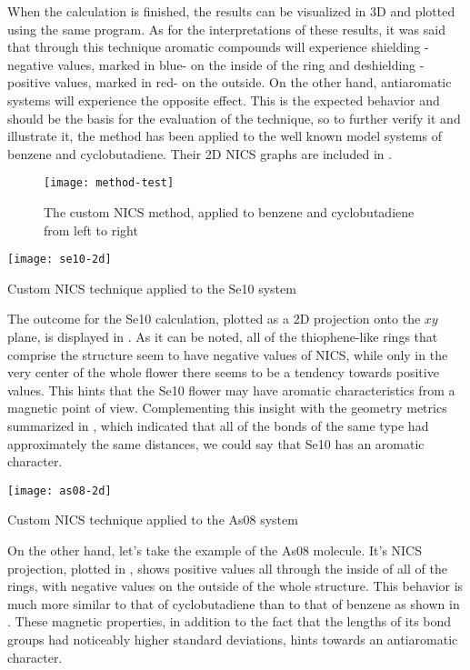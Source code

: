 When the calculation is finished, the results can be visualized in 3D and plotted using the same program.
As for the interpretations of these results, it was said that through this technique aromatic compounds will experience shielding -negative values, marked in blue- on the inside of the ring and deshielding -positive values, marked in red- on the outside.
On the other hand, antiaromatic systems will experience the opposite effect.
This is the expected behavior and should be the basis for the evaluation of the technique, so to further verify it and illustrate it, the method has been applied to the well known model systems of benzene and cyclobutadiene.
Their 2D NICS graphs are included in .

\begin{figure}[h]
    \texttt{[image: method-test]}
    \caption[NICS applied to test systems]{The custom NICS method, applied to benzene and cyclobutadiene from left to right}
\end{figure}

\begin{marginfigure}
    \texttt{[image: se10-2d]}
    \caption[NICS applied to Se10]{Custom NICS technique applied to the Se10 system}
\end{marginfigure}

The outcome for the Se10 calculation, plotted as a 2D projection onto the $xy$ plane, is displayed in .
As it can be noted, all of the thiophene-like rings that comprise the structure seem to have negative values of NICS, while only in the very center of the whole flower there seems to be a tendency towards positive values.
This hints that the Se10 flower may have aromatic characteristics from a magnetic point of view.
Complementing this insight with the geometry metrics summarized in , which indicated that all of the bonds of the same type had approximately the same distances, we could say that Se10 has an aromatic character.

\begin{marginfigure}
    \texttt{[image: as08-2d]}
    \caption[NICS applied to As08]{Custom NICS technique applied to the As08 system}
\end{marginfigure}

On the other hand, let's take the example of the As08 molecule.
It's NICS projection, plotted in , shows positive values all through the inside of all of the rings, with negative values on the outside of the whole structure.
This behavior is much more similar to that of cyclobutadiene than to that of benzene as shown in .
These magnetic properties, in addition to the fact that the lengths of its bond groups had noticeably higher standard deviations, hints towards an antiaromatic character.

